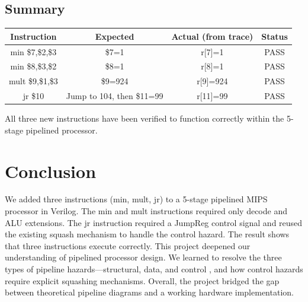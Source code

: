 \documentclass[conference]{IEEEtran}
\begin{document}
\subsection{Summary}

\begin{table}[h]
\centering
\begin{tabular}{|c|c|c|c|}
\hline
Instruction & Expected & Actual (from trace) & Status \\
\hline
min \$7,\$2,\$3 & \$7=1 & r[7]=1 &  PASS \\
min \$8,\$3,\$2 & \$8=1 & r[8]=1 &  PASS \\
mult \$9,\$1,\$3 & \$9=924 & r[9]=924 &  PASS \\
jr \$10 & Jump to 104, then \$11=99 & r[11]=99 &  PASS \\
\hline
\end{tabular}
\end{table}

All three new instructions have been verified to function correctly within the 5-stage pipelined processor.

\section{Conclusion}
We added three instructions (min, mult, jr) to a 5-stage
pipelined MIPS processor in Verilog. The min and mult
instructions required only decode and ALU extensions.
The jr instruction required a JumpReg control signal and
reused the existing squash mechanism to handle the control
hazard. The result shows that three instructions execute
correctly. This project deepened our understanding of pipelined processor design. We learned to resolve the three types of pipeline hazards—structural, data, and control , and how control hazards require explicit squashing mechanisms. Overall, the project bridged the gap between theoretical pipeline diagrams and a working hardware implementation.
\end{document}
